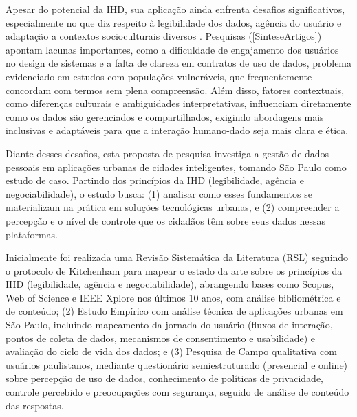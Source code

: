 \documentclass[
	12pt,				%
	oneside,			%
	a4paper,			%
	english,			%
	brazil				%
	]{abntex2ppgsi}
\begin{document}
    Apesar do potencial da IHD, sua aplicação ainda enfrenta desafios significativos, especialmente no que diz respeito à legibilidade dos dados, agência do usuário e adaptação a contextos socioculturais diversos \cite{VICTORELLI2020Understanding}. Pesquisas (\ref{SinteseArtigos}) apontam lacunas importantes, como a dificuldade de engajamento dos usuários no design de sistemas e a falta de clareza em contratos de uso de dados, problema evidenciado em estudos com populações vulneráveis, que frequentemente concordam com termos sem plena compreensão. Além disso, fatores contextuais, como diferenças culturais e ambiguidades interpretativas, influenciam diretamente como os dados são gerenciados e compartilhados, exigindo abordagens mais inclusivas e adaptáveis para que a interação humano-dado seja mais clara e ética.

    Diante desses desafios, esta proposta de pesquisa investiga a gestão de dados pessoais em aplicações urbanas de cidades inteligentes, tomando São Paulo como estudo de caso. Partindo dos princípios da IHD (legibilidade, agência e negociabilidade), o estudo busca: (1) analisar como esses fundamentos se materializam na prática em soluções tecnológicas urbanas, e (2) compreender a percepção e o nível de controle que os cidadãos têm sobre seus dados nessas plataformas.

    Inicialmente foi realizada uma Revisão Sistemática da Literatura (RSL) seguindo o protocolo de Kitchenham para mapear o estado da arte sobre os princípios da IHD (legibilidade, agência e negociabilidade), abrangendo bases como Scopus, Web of Science e IEEE Xplore nos últimos 10 anos, com análise bibliométrica e de conteúdo; (2) Estudo Empírico com análise técnica de aplicações urbanas em São Paulo, incluindo mapeamento da jornada do usuário (fluxos de interação, pontos de coleta de dados, mecanismos de consentimento e usabilidade) e avaliação do ciclo de vida dos dados; e (3) Pesquisa de Campo qualitativa com usuários paulistanos, mediante questionário semiestruturado (presencial e online) sobre percepção de uso de dados, conhecimento de políticas de privacidade, controle percebido e preocupações com segurança, seguido de análise de conteúdo das respostas.

\end{document}
